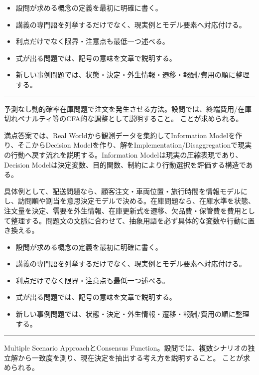 \begin{itemize}
\item 設問が求める概念の定義を最初に明確に書く。
\item 講義の専門語を列挙するだけでなく、現実例とモデル要素へ対応付ける。
\item 利点だけでなく限界・注意点も最低一つ述べる。
\item 式が出る問題では、記号の意味を文章で説明する。
\item 新しい事例問題では、状態・決定・外生情報・遷移・報酬/費用の順に整理する。
\end{itemize}
\vspace{2mm}\hrule\vspace{2mm}
予測なし動的確率在庫問題で注文を発生させる方法。設問では、終端費用/在庫切れペナルティ等のCFA的な調整として説明すること。 ことが求められる。\par
{}
満点答案では、Real Worldから観測データを集約してInformation Modelを作り、そこからDecision Modelを作り、解をImplementation/Disaggregationで現実の行動へ戻す流れを説明する。Information Modelは現実の圧縮表現であり、Decision Modelは決定変数、目的関数、制約により行動選択を評価する構造である。\par
{}
具体例として、配送問題なら、顧客注文・車両位置・旅行時間を情報モデルにし、訪問順や割当を意思決定モデルで決める。在庫問題なら、在庫水準を状態、注文量を決定、需要を外生情報、在庫更新式を遷移、欠品費・保管費を費用として整理する。問題文の文脈に合わせて、抽象用語を必ず具体的な変数や行動に置き換える。\par
{}
\begin{itemize}
\item 設問が求める概念の定義を最初に明確に書く。
\item 講義の専門語を列挙するだけでなく、現実例とモデル要素へ対応付ける。
\item 利点だけでなく限界・注意点も最低一つ述べる。
\item 式が出る問題では、記号の意味を文章で説明する。
\item 新しい事例問題では、状態・決定・外生情報・遷移・報酬/費用の順に整理する。
\end{itemize}
\vspace{2mm}\hrule\vspace{2mm}
Multiple Scenario ApproachとConsensus Function。設問では、複数シナリオの独立解から一致度を測り、現在決定を抽出する考え方を説明すること。 ことが求められる。\par
